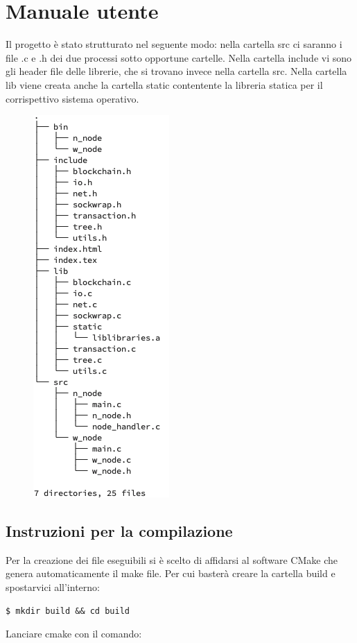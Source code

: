\documentclass[a4paper,10pt]{report}
\begin{document}
  \chapter{Manuale utente}
	Il progetto è stato strutturato nel seguente modo: nella cartella src ci saranno i file .c e .h dei due processi sotto opportune cartelle. Nella cartella include vi sono gli header file delle librerie, che si trovano invece nella cartella src. Nella cartella lib viene creata anche la cartella static contentente la libreria statica per il corrispettivo sistema operativo.
	\begin{figure}[H]
  \center\includegraphics[scale=0.40]{dirs.png}
  \end{figure}




\section{Instruzioni per la compilazione}\noindent	Per la creazione dei file eseguibili si è scelto di affidarsi al software CMake che genera automaticamente il make file.
Per cui basterà creare la cartella build e spostarvici all'interno:
\begin{lstlisting}
$ mkdir build && cd build
\end{lstlisting}
Lanciare cmake con il comando:
\end{document}
